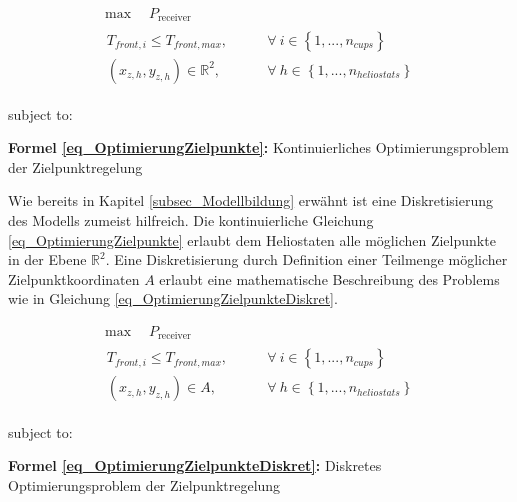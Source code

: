 \begin{equation} \label{eq_OptimierungZielpunkte}
\begin{gathered}
    \max \quad P_{\text {receiver }}  \qquad \\
    \begin{aligned}
        T_{front,i} \leq T_{front,max}, \qquad                 & \forall~i \in \left\{1, ..., n_{cups} \right\}       \\
        \left(x_{z,h}, y_{z,h}\right) \in \mathbb{R}^2, \qquad & \forall~h \in \left\{1, ..., n_{heliostats} \right\}
    \end{aligned}
\end{gathered}
\end{equation}

\vspace*{-2.95\baselineskip}
\qquad subject to:
\vspace*{1.95\baselineskip}
\centerline{\small{\textsf{\textbf{Formel \ref{eq_OptimierungZielpunkte}:}} Kontinuierliches Optimierungsproblem der Zielpunktregelung}}

Wie bereits in Kapitel \ref{subsec_Modellbildung} erwähnt ist eine Diskretisierung des Modells zumeist hilfreich.
Die kontinuierliche Gleichung \ref{eq_OptimierungZielpunkte} erlaubt dem Heliostaten alle möglichen Zielpunkte in der Ebene $\mathbb{R}^2$.
Eine Diskretisierung durch Definition einer Teilmenge möglicher Zielpunktkoordinaten $A$ erlaubt eine mathematische Beschreibung des Problems wie in Gleichung \ref{eq_OptimierungZielpunkteDiskret}.

\begin{equation} \label{eq_OptimierungZielpunkteDiskret}
\begin{gathered}
    \max \quad P_{\text {receiver }}  \qquad \\
    \begin{aligned}
        T_{front,i} \leq T_{front,max}, \qquad      & \forall~i \in \left\{1, ..., n_{cups} \right\}       \\
        \left(x_{z,h}, y_{z,h}\right) \in A, \qquad & \forall~h \in \left\{1, ..., n_{heliostats} \right\}
    \end{aligned}
\end{gathered}
\end{equation}

\enlargethispage*{2\baselineskip}
\vspace*{-2.95\baselineskip}
\qquad subject to:
\vspace*{1.95\baselineskip}
\centerline{\small{\textsf{\textbf{Formel \ref{eq_OptimierungZielpunkteDiskret}:}} Diskretes Optimierungsproblem der Zielpunktregelung}}

